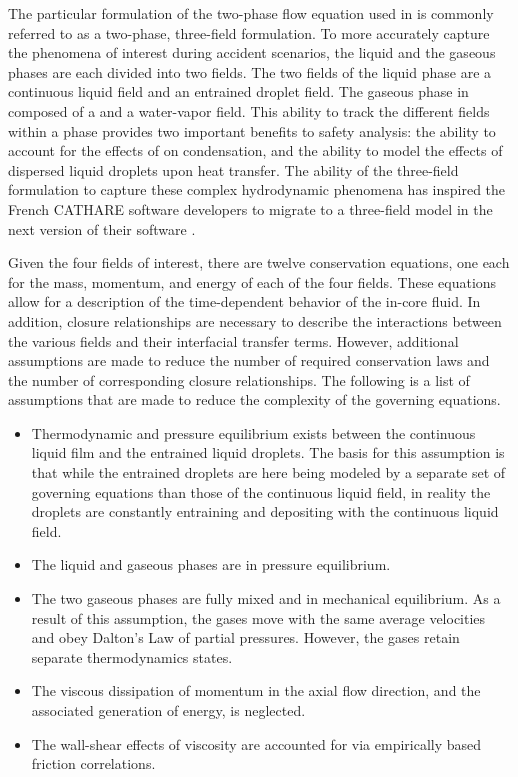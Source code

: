 The particular formulation of the two-phase flow equation used in \cobra is commonly referred to as a two-phase, three-field formulation.
To more accurately capture the phenomena of interest during accident scenarios, the liquid and the gaseous phases are each divided into two fields.
The two fields of the liquid phase are a continuous liquid field and an entrained droplet field.
The gaseous phase in composed of a \ncg and a water-vapor field. 
This ability to track the different fields within a phase provides two important benefits to safety analysis: the ability to account for the effects of \ncgs on condensation, and the ability to model the effects of dispersed liquid droplets  upon heat transfer.
The ability of the three-field formulation to capture these complex hydrodynamic phenomena has inspired the French CATHARE software developers to migrate to a three-field model in the next version of their software \cite{Emonot2011}.

Given the four fields of interest, there are twelve conservation equations, one each for the mass, momentum, and energy of each of the four fields.
These equations allow for a description of the time-dependent behavior of the in-core fluid.
In addition, closure relationships are necessary to describe the interactions between the various fields and their interfacial transfer terms.
However, additional assumptions are made to reduce the number of required conservation laws and the number of corresponding closure relationships.
The following is a list of assumptions that are made to reduce the complexity of the governing equations.

\begin{itemize}
\item{
Thermodynamic and pressure equilibrium exists between the continuous liquid film and the entrained liquid droplets.
The basis for this assumption is that while the entrained droplets are here being modeled by a separate set of governing equations than those of the continuous liquid field, in reality the droplets are constantly entraining and depositing with the continuous liquid field. 
}
\item{
The liquid and gaseous phases are in pressure equilibrium.
}
\item{
The two gaseous phases are fully mixed and in mechanical equilibrium.
As a result of this assumption, the gases move with the same average velocities and obey Dalton's Law of partial pressures.
However, the gases retain separate thermodynamics states.
}
\item{
The viscous dissipation of momentum in the axial flow direction, and the associated generation of energy, is neglected.
}
\item{
The wall-shear effects of viscosity are accounted for via empirically based friction correlations.
}
\end{itemize}

